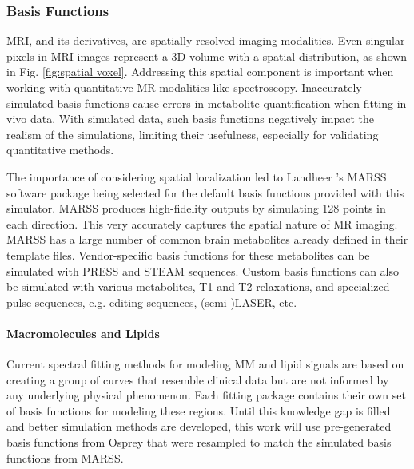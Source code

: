 




\subsubsection{Basis Functions}
MRI, and its derivatives, are spatially resolved imaging modalities. Even singular pixels in MRI images represent a 3D volume with a spatial distribution, as shown in Fig. \ref{fig:spatial voxel}. Addressing this spatial component is important when working with quantitative MR modalities like spectroscopy. Inaccurately simulated basis functions cause errors in metabolite quantification when fitting in vivo data. With simulated data, such basis functions negatively impact the realism of the simulations, limiting their usefulness, especially for validating quantitative methods.
 
The importance of considering spatial localization led to Landheer \etal's MARSS\cite{Landheer2021} software package being selected for the default basis functions provided with this simulator. MARSS produces high-fidelity outputs by simulating 128 points in each direction. This very accurately captures the spatial nature of MR imaging. MARSS has a large number of common brain metabolites already defined in their template files. Vendor-specific basis functions for these metabolites can be simulated with PRESS and STEAM sequences. Custom basis functions can also be simulated with various metabolites, T1 and T2 relaxations, and specialized pulse sequences, e.g. editing sequences, (semi-)LASER, etc.
 

 
\paragraph{Macromolecules and Lipids}
Current spectral fitting methods for modeling MM and lipid signals are based on creating a group of curves that resemble clinical data but are not informed by any underlying physical phenomenon. Each fitting package contains their own set of basis functions for modeling these regions. Until this knowledge gap is filled and better simulation methods are developed, this work will use pre-generated basis functions from Osprey\cite{Oeltzschner2020} that were resampled to match the simulated basis functions from MARSS.
 
